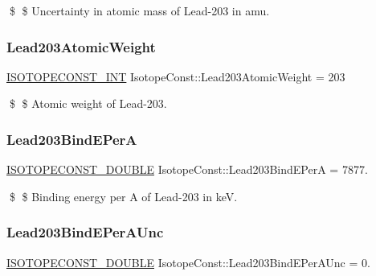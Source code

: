 \$ \$ Uncertainty in atomic mass of Lead-\/203 in amu. \mbox{\label{group___isotope_const-_lead-_pb203_gade4bbf069dec392255a8b6ee567faf6c}} 
\subsubsection{\texorpdfstring{Lead203\+Atomic\+Weight}{Lead203AtomicWeight}}
{\footnotesize\ttfamily \mbox{\hyperlink{group___isotope_const-_macros_ga5f18360b3e99483a35c32d789e62621c}{I\+S\+O\+T\+O\+P\+E\+C\+O\+N\+S\+T\+\_\+\+I\+NT}} Isotope\+Const\+::\+Lead203\+Atomic\+Weight = 203}

\$ \$ Atomic weight of Lead-\/203. \mbox{\label{group___isotope_const-_lead-_pb203_ga3519c71f8f248ed6cc1856a1c3c37c2f}} 
\subsubsection{\texorpdfstring{Lead203\+Bind\+E\+PerA}{Lead203BindEPerA}}
{\footnotesize\ttfamily \mbox{\hyperlink{group___isotope_const-_macros_ga8f45a7272ce02c0b4c65c44636ed719a}{I\+S\+O\+T\+O\+P\+E\+C\+O\+N\+S\+T\+\_\+\+D\+O\+U\+B\+LE}} Isotope\+Const\+::\+Lead203\+Bind\+E\+PerA = 7877.}

\$ \$ Binding energy per A of Lead-\/203 in keV. \mbox{\label{group___isotope_const-_lead-_pb203_ga9fecf3ccf1abf379535a76b810af2153}} 
\subsubsection{\texorpdfstring{Lead203\+Bind\+E\+Per\+A\+Unc}{Lead203BindEPerAUnc}}
{\footnotesize\ttfamily \mbox{\hyperlink{group___isotope_const-_macros_ga8f45a7272ce02c0b4c65c44636ed719a}{I\+S\+O\+T\+O\+P\+E\+C\+O\+N\+S\+T\+\_\+\+D\+O\+U\+B\+LE}} Isotope\+Const\+::\+Lead203\+Bind\+E\+Per\+A\+Unc = 0.}

